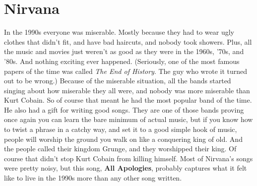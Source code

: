\documentclass[letterpaper,single]{article}
\begin{document}
\section{Nirvana}
In the 1990s everyone was miserable. 
Mostly because they had to wear ugly clothes that didn't fit, and have bad haircuts, and nobody took showers. 
Plus, all the music and movies just weren't as good as they were in the 1960s, '70s, and '80s. 
And nothing exciting ever happened. 
(Seriously, one of the most famous papers of the time was called \emph{The End of History}. The guy who wrote it turned out to be wrong.)
Because of the miserable situation, all the bands started singing about how miserable they all were, and nobody was more miserable than Kurt Cobain. 
So of course that meant he had the most popular band of the time. 
He also had a gift for writing good songs. 
They are one of those bands proving once again you can learn the bare minimum of actual music, but if you know how to twist a phrase in a catchy way, and set it to a good simple hook of music, people will worship the ground you walk on like a conquering king of old. 
And the people called their kingdom Grunge, and they worshipped their king.
Of course that didn't stop Kurt Cobain from killing himself.
Most of Nirvana's songs were pretty noisy, but this song, \textbf{All Apologies}, probably captures what it felt like to live in the 1990s more than any other song written.
\end{document}
